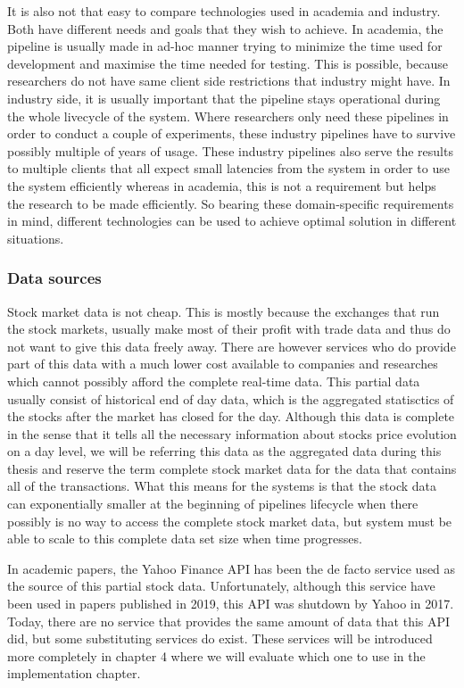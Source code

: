 It is also not that easy to compare technologies used in academia and industry.
Both have different needs and goals that they wish to achieve.
In academia, the pipeline is usually made in ad-hoc manner trying to minimize the time used for development and maximise the time needed for testing.
This is possible, because researchers do not have same client side restrictions that industry might have.
In industry side, it is usually important that the pipeline stays operational during the whole livecycle of the system.
Where researchers only need these pipelines in order to conduct a couple of experiments, these industry pipelines have to survive possibly multiple of years of usage.
These industry pipelines also serve the results to multiple clients that all expect small latencies from the system in order to use the system efficiently whereas in academia, this is not a requirement but helps the research to be made efficiently.
So bearing these domain-specific requirements in mind, different technologies can be used to achieve optimal solution in different situations.

\subsubsection{Data sources}

Stock market data is not cheap.
This is mostly because the exchanges that run the stock markets, usually make most of their profit with trade data and thus do not want to give this data freely away.
There are however services who do provide part of this data with a much lower cost available to companies and researches which cannot possibly afford the complete real-time data.
This partial data usually consist of historical end of day data, which is the aggregated statisctics of the stocks after the market has closed for the day.
Although this data is complete in the sense that it tells all the necessary information about stocks price evolution on a day level, we will be referring this data as the aggregated data during this thesis and reserve the term complete stock market data for the data that contains all of the transactions.
What this means for the systems is that the stock data can exponentially smaller at the beginning of pipelines lifecycle when there possibly is no way to access the complete stock market data, but system must be able to scale to this complete data set size when time progresses.

In academic papers, the Yahoo Finance API has been the de facto service used as the source of this partial stock data. \cite{islam} \cite{adresic} \cite{le} \cite{serez}
Unfortunately, although this service have been used in papers published in 2019, this API was shutdown by Yahoo in 2017.
Today, there are no service that provides the same amount of data that this API did, but some substituting services do exist.\cite{lotter}
These services will be introduced more completely in chapter 4 where we will evaluate which one to use in the implementation chapter.

